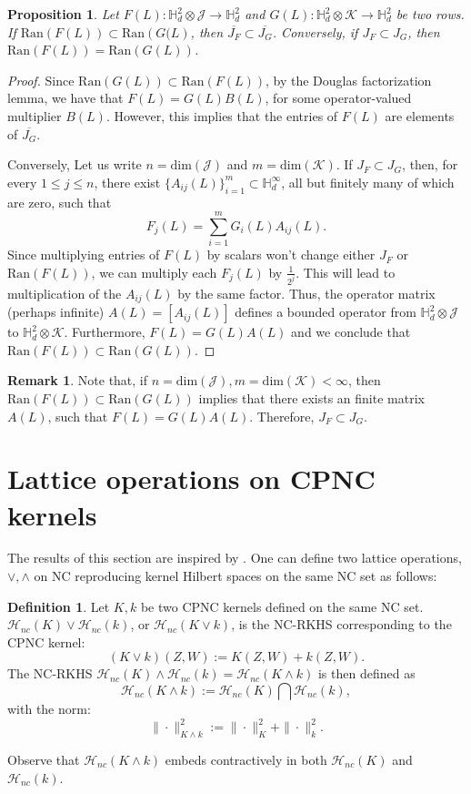\documentclass[11pt]{article}
\def\bH{\mathbb{H}}
\def\mult{\mathbb{H} ^\infty _d}
\renewcommand{\H}{\ensuremath{\mathcal{H} }}
\newcommand{\J}{\ensuremath{\mathcal{J} }}
\newcommand{\K}{\ensuremath{\mathcal{K} }}
\renewcommand{\dim}[1]{\ensuremath{\mathrm{dim} \left( {#1} \right) }}
\newcommand{\ran}[1]{\ensuremath{\mathrm{Ran} \left( {#1} \right) }}
\numberwithin{equation}{section}
\numberwithin{subsection}{section}
\newtheorem{prop}[subsection]{Proposition}
\theoremstyle{definition}
\newtheorem{defn}[subsection]{Definition}
\newtheorem{remark}[subsection]{Remark}
\begin{document}
\begin{prop}
Let $F(L) \colon \bH ^2_d \otimes \J \to \bH ^2_d$ and $G(L) \colon \bH ^2_d \otimes \K \to \bH ^2_d$ be two rows. If $\ran{F(L)} \subset \ran{G(L}$, then $\overline{J_F} \subset \overline{J_G}$. Conversely, if $J_F \subset J_G$, then $\ran{F(L)} = \ran{G(L)}$.
\end{prop}
\begin{proof}
Since $\ran{G(L)} \subset \ran{F(L)}$, by the Douglas factorization lemma, we have that $F(L) = G(L) B(L)$, for some operator-valued multiplier $B(L)$. However, this implies that the entries of $F(L)$ are elements of $\overline{J_G}$.

Conversely, Let us write $n = \dim{\J}$ and $m = \dim{\K}$. If $J_F \subset J_G$, then, for every $1 \leq j \leq n$, there exist $\{A_{ij}(L)\}_{i=1}^m \subset \mult$, all but finitely many of which are zero, such that 
\[
F_j(L) = \sum_{i = 1}^m G_i(L) A_{ij}(L).
\]
Since multiplying entries of $F(L)$ by scalars won't change either $J_F$ or $\ran{F(L)}$, we can multiply each $F_j(L)$ by $\frac{1}{2^j}$. This will lead to multiplication of the $A_{ij}(L)$ by the same factor. Thus, the operator matrix (perhaps infinite) $A(L) = \left[ A_{ij}(L) \right]$ defines a bounded operator from $\bH ^2_d \otimes \J$ to $\bH ^2_d \otimes \K$. Furthermore, $F(L) = G(L) A(L)$ and we conclude that $\ran{F(L)} \subset \ran{G(L)}$.
\end{proof}

\begin{remark}
Note that, if $n = \dim{\J}, m = \dim{\K} < \infty$, then $\ran{F(L)} \subset \ran{G(L)}$ implies that there exists an finite matrix $A(L)$, such that $F(L) = G(L) A(L)$. Therefore, $J_F \subset J_G$.
\end{remark}

\section{Lattice operations on CPNC kernels} \label{sec:lattice_kernels}

The results of this section are inspired by \cite{Aron-RKHS,GheOkut}. One can define two lattice operations, $\vee, \wedge$ on NC reproducing kernel Hilbert spaces on the same NC set as follows:

\begin{defn}
Let $K, k$ be two CPNC kernels defined on the same NC set. $\H _{nc} (K) \vee \H _{nc} (k)$, or $\H _{nc} (K \vee k)$, is the NC-RKHS corresponding to the CPNC kernel:
$$ (K\vee k ) (Z, W) := K(Z,W) + k (Z,W). $$ 
The NC-RKHS $\H _{nc} (K ) \wedge \H _{nc} (k) = \H _{nc} (K \wedge k)$ is then defined as 
$$ \H _{nc} (K \wedge k) := \H _{nc} (K) \bigcap \H _{nc} (k), $$ with the norm:
$$ \| \cdot \| ^2 _{K \wedge k} := \| \cdot \| ^2 _K + \| \cdot \| ^2 _k. $$ 
\end{defn}
Observe that $\H _{nc} (K \wedge k)$ embeds contractively in both $\H _{nc} (K)$ and $\H _{nc} (k)$.
\end{document}
